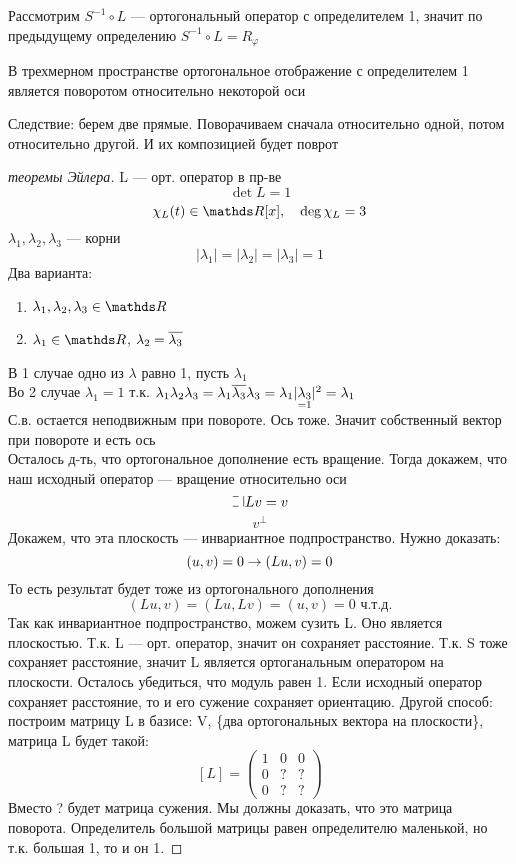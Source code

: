 \documentclass[main]{subfiles}
\begin{document}
    Рассмотрим $S^{-1} \circ L$ --- ортогональный оператор с определителем 1, значит по предыдущему определению $S^{-1} \circ L = R_{\varphi}$

    \begin{utv}
        В трехмерном пространстве ортогональное отображение с определителем 1 является поворотом относительно некоторой оси
    \end{utv}

    Следствие: берем две прямые. Поворачиваем сначала относительно одной, потом относительно другой. И их композицией будет поврот

    \begin{proof}[теоремы Эйлера]
        L --- орт. оператор в пр-ве
        \[\det L = 1\]
        \[\chi_L(t) \in \R[x],\q \deg \chi_L = 3\]
        $\lambda_1, \lambda_2, \lambda_3$ --- корни
        \[|\lambda_1| = |\lambda_2| = |\lambda_3| = 1\]
        Два варианта:
        \begin{enumerate}
            \item $\lambda_1, \lambda_2, \lambda_3 \in \R$
            \item $\lambda_1 \in \R$, $\lambda_2 = \overline{\lambda_3}$
        \end{enumerate}
        В 1 случае одно из $\lambda$ равно 1, пусть $\lambda_1$\\
        Во 2 случае $\lambda_1 = 1$ т.к. $\lambda_1 \lambda_2 \lambda_3 = \lambda_1 \overline{\lambda_3} \lambda_3 = \lambda_1 |\underset{=1}{\lambda_3}|^2 = \lambda_1$\\
        С.в. остается неподвижным при повороте. Ось тоже. Значит собственный вектор  при повороте и есть ось\\
        Осталось д-ть, что ортогональное дополнение есть вращение. Тогда докажем, что наш исходный оператор --- вращение относительно оси
        \[\letus Lv = v\]
        \[v^{\bot}\]
        Докажем, что эта плоскость --- инвариантное подпространство. Нужно доказать:
        \[(u,v) = 0 \rightarrow (Lu, v) = 0\]
        То есть результат будет тоже из ортогонального дополнения
        \[(Lu,v) = (Lu, Lv) = (u,v) = 0 \text{ ч.т.д.}\]
        Так как инвариантное подпространство, можем сузить L. Оно является плоскостью. Т.к. L --- орт. оператор, значит он сохраняет расстояние. Т.к. S тоже сохраняет расстояние, значит L является ортоганальным оператором на плоскости. Осталось убедиться, что модуль равен 1. Если исходный оператор сохраняет расстояние, то и его сужение сохраняет ориентацию. Другой способ: построим матрицу L в базисе: V, \{два ортогональных вектора на плоскости\}, матрица L будет такой:\\
        \[[L] = \begin{pmatrix}
            1 & 0 & 0\\
            0 & ? & ?\\
            0 & ? & ?
        \end{pmatrix}\]
        Вместо ? будет матрица сужения. Мы должны доказать, что это матрица поворота. Определитель большой матрицы равен определителю маленькой, но т.к. большая 1, то и он 1.


\end{proof}
\end{document}
